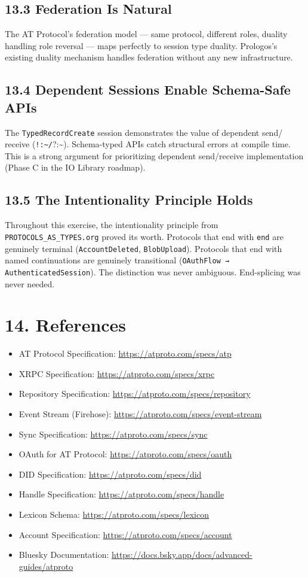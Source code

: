 \documentclass[11pt]{article}
\begin{document}
\subsection{13.3 Federation Is Natural}
\label{sec:org5ea830c}

The AT Protocol's federation model --- same protocol, different roles,
duality handling role reversal --- maps perfectly to session type duality.
Prologos's existing duality mechanism handles federation without any new
infrastructure.
\subsection{13.4 Dependent Sessions Enable Schema-Safe APIs}
\label{sec:org8e963c0}

The \texttt{TypedRecordCreate} session demonstrates the value of dependent send/
receive (\texttt{!:\textasciitilde{}/}?:\textasciitilde{}). Schema-typed APIs catch structural errors at compile
time. This is a strong argument for prioritizing dependent send/receive
implementation (Phase C in the IO Library roadmap).
\subsection{13.5 The Intentionality Principle Holds}
\label{sec:org9cdc404}

Throughout this exercise, the intentionality principle from
\texttt{PROTOCOLS\_AS\_TYPES.org} proved its worth. Protocols that end with \texttt{end} are
genuinely terminal (\texttt{AccountDeleted}, \texttt{BlobUpload}). Protocols that end
with named continuations are genuinely transitional (\texttt{OAuthFlow →
AuthenticatedSession}). The distinction was never ambiguous. End-splicing
was never needed.
\section{14. References}
\label{sec:org516a371}

\begin{itemize}
\item AT Protocol Specification: \url{https://atproto.com/specs/atp}
\item XRPC Specification: \url{https://atproto.com/specs/xrpc}
\item Repository Specification: \url{https://atproto.com/specs/repository}
\item Event Stream (Firehose): \url{https://atproto.com/specs/event-stream}
\item Sync Specification: \url{https://atproto.com/specs/sync}
\item OAuth for AT Protocol: \url{https://atproto.com/specs/oauth}
\item DID Specification: \url{https://atproto.com/specs/did}
\item Handle Specification: \url{https://atproto.com/specs/handle}
\item Lexicon Schema: \url{https://atproto.com/specs/lexicon}
\item Account Specification: \url{https://atproto.com/specs/account}
\item Bluesky Documentation: \url{https://docs.bsky.app/docs/advanced-guides/atproto}
\end{itemize}
\end{document}

